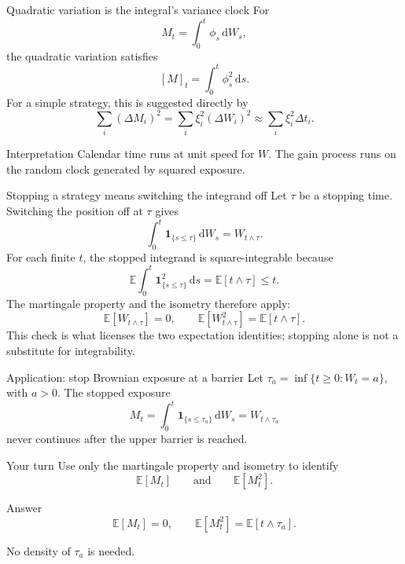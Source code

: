 \documentclass[10pt,aspectratio=169]{beamer}
\newcommand{\E}{\mathbb E}
\newcommand{\dd}{\,\mathrm d}
\begin{document}
\begin{frame}{Quadratic variation is the integral's variance clock}
For
\[
M_t=\int_0^t\phi_s\dd W_s,
\]
the quadratic variation satisfies
\[
\boxed{[M]_t=\int_0^t\phi_s^2\dd s.}
\]
For a simple strategy, this is suggested directly by
\[
\sum_i(\Delta M_i)^2
=\sum_i\xi_i^2(\Delta W_i)^2
\approx\sum_i\xi_i^2\Delta t_i.
\]
\begin{block}{Interpretation}
Calendar time runs at unit speed for \(W\). The gain process runs on the random clock generated by squared exposure.
\end{block}
\end{frame}

\begin{frame}{Stopping a strategy means switching the integrand off}
\small
Let \(\tau\) be a stopping time. Switching the position off at \(\tau\) gives
\[
\boxed{
\int_0^t\mathbf 1_{\{s\le\tau\}}\dd W_s
=W_{t\wedge\tau}.}
\]
For each finite \(t\), the stopped integrand is square-integrable because
\[
\E\int_0^t\mathbf 1_{\{s\le\tau\}}^2\dd s
=\E[t\wedge\tau]\le t.
\]
The martingale property and the isometry therefore apply:
\[
\boxed{
\E[W_{t\wedge\tau}]=0,
\qquad
\E[W_{t\wedge\tau}^2]=\E[t\wedge\tau].}
\]
This check is what licenses the two expectation identities; stopping alone is not a substitute for integrability.
\end{frame}

\begin{frame}{Application: stop Brownian exposure at a barrier}
Let \(\tau_a=\inf\{t\ge0:W_t=a\}\), with \(a>0\). The stopped exposure
\[
M_t=\int_0^t\mathbf 1_{\{s\le\tau_a\}}\dd W_s
=W_{t\wedge\tau_a}
\]
never continues after the upper barrier is reached.
\begin{block}{Your turn}
Use only the martingale property and isometry to identify
\[
\E[M_t]
\qquad\text{and}\qquad
\E[M_t^2].
\]
\end{block}
\begin{block}{Answer}
\[
\E[M_t]=0,
\qquad
\E[M_t^2]=\E[t\wedge\tau_a].
\]
\end{block}
No density of \(\tau_a\) is needed.
\end{frame}
\end{document}
